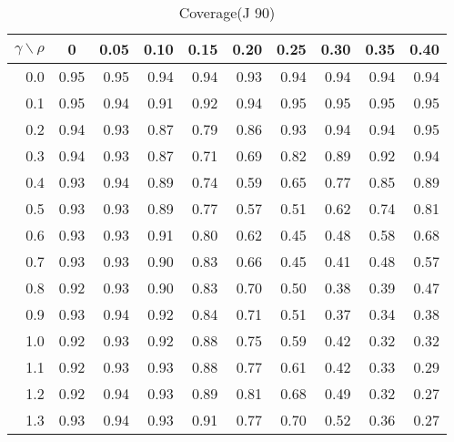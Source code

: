 \documentclass[12pt]{article}
\begin{document}
%
\begin{table}[!tbp]
\caption{Coverage(J 90)}
 \begin{center}
 \begin{tabular}{r|rrrrrrrrr}\hline\hline
\multicolumn{1}{c|}{$\gamma\backslash\rho$}&\multicolumn{1}{c}{0}&\multicolumn{1}{c}{0.05}&\multicolumn{1}{c}{0.10}&\multicolumn{1}{c}{0.15}&\multicolumn{1}{c}{0.20}&\multicolumn{1}{c}{0.25}&\multicolumn{1}{c}{0.30}&\multicolumn{1}{c}{0.35}&\multicolumn{1}{c}{0.40}\tabularnewline
\hline

0.0&0.95&0.95&0.94&0.94&0.93&0.94&0.94&0.94&0.94\tabularnewline
0.1&0.95&0.94&0.91&0.92&0.94&0.95&0.95&0.95&0.95\tabularnewline
0.2&0.94&0.93&0.87&0.79&0.86&0.93&0.94&0.94&0.95\tabularnewline
0.3&0.94&0.93&0.87&0.71&0.69&0.82&0.89&0.92&0.94\tabularnewline
0.4&0.93&0.94&0.89&0.74&0.59&0.65&0.77&0.85&0.89\tabularnewline
0.5&0.93&0.93&0.89&0.77&0.57&0.51&0.62&0.74&0.81\tabularnewline
0.6&0.93&0.93&0.91&0.80&0.62&0.45&0.48&0.58&0.68\tabularnewline
0.7&0.93&0.93&0.90&0.83&0.66&0.45&0.41&0.48&0.57\tabularnewline
0.8&0.92&0.93&0.90&0.83&0.70&0.50&0.38&0.39&0.47\tabularnewline
0.9&0.93&0.94&0.92&0.84&0.71&0.51&0.37&0.34&0.38\tabularnewline
1.0&0.92&0.93&0.92&0.88&0.75&0.59&0.42&0.32&0.32\tabularnewline
1.1&0.92&0.93&0.93&0.88&0.77&0.61&0.42&0.33&0.29\tabularnewline
1.2&0.92&0.94&0.93&0.89&0.81&0.68&0.49&0.32&0.27\tabularnewline
1.3&0.93&0.94&0.93&0.91&0.77&0.70&0.52&0.36&0.27\tabularnewline
\hline
\end{tabular}

\end{center}

\end{table}
\end{document}
